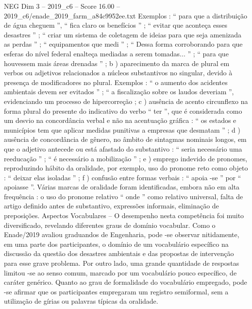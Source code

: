 \begin{textsample}{NEG Dim 3 – 2019\_c6 – Score 16.00 – 2019\_c6/enade\_2019\_farm\_a84c9952ee.txt}
Exemplos : “ para que a distribuição de água cheguem ”, “ fica claro os benefícios ” ; “ evitar que aconteça esses desastres ” ; “ criar um sistema de coletagem de ideias para que seja amenizada as perdas ” ; “ equipamentos que medi ” ; “ Dessa forma corroborando para que esferas do nível federal enalteça mediadas a serem tomadas... ” ; “ para que houvessem mais áreas drenadas ” ; b ) aparecimento da marca de plural em verbos ou adjetivos relacionados a núcleos substantivos no singular, devido à presença de modificadores no plural.
Exemplos : “ o aumento dos acidentes ambientais devem ser evitados ” ; “ a fiscalização sobre os laudos deveriam ”, evidenciando um processo de hipercorreção ; c ) ausência de acento circunflexo na forma plural do presente do indicativo do verbo “ ter ”, que é considerada como um desvio na concordância verbal e não na acentuação gráfica : “ os estados e municípios tem que aplicar medidas punitivas a empresas que desmatam ” ; d ) ausência de concordância de gênero, no âmbito de sintagmas nominais longos, em que o adjetivo antecede ou está afastado do substantivo : “ seria necessário uma reeducação ” ; “ é necessário a mobilização ” ; e ) emprego indevido de pronomes, reproduzindo hábito da oralidade, por exemplo, uso do pronome reto como objeto : “ deixar elas isoladas ” ; f ) confusão entre formas verbais : “ apoia -se ” por “ apoiasse ”.
Várias marcas de oralidade foram identificadas, embora não em alta frequência : o uso do pronome relativo “ onde ” como relativo universal, falta de artigo definido antes de substantivo, expressões informais, eliminação de preposições.
Aspectos Vocabulares – O desempenho nesta competência foi muito diversificado, revelando diferentes graus de domínio vocabular.
Como o Enade/2019 avaliou graduandos de Engenharia, pode -se observar nitidamente, em uma parte dos participantes, o domínio de um vocabulário específico na discussão da questão dos desastres ambientais e das propostas de intervenção para esse grave problema.
Por outro lado, uma grande quantidade de respostas limitou -se ao senso comum, marcado por um vocabulário pouco específico, de caráter genérico.
Quanto ao grau de formalidade do vocabulário empregado, pode -se afirmar que os participantes empregaram um registro semiformal, sem a utilização de gírias ou palavras típicas da oralidade.

\end{textsample}
